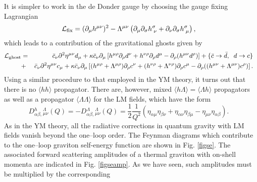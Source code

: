 \documentclass[longbibliography,groupedaddress,showpacs,showkeys,amssymb,eqsecnum,aps,nofootinbib,superscriptaddress]{revtex4}
\newcommand{\be}{\begin{equation}}
\newcommand{\ee}{\end{equation}}
\begin{document}
It is simpler to work in the de Donder gauge by choosing the gauge fixing Lagrangian
\be
{\cal L}_{\rm fix} = (\partial_\mu h^{\mu\nu})^2 - %
\Lambda^{\mu\nu}\left(
\partial_\mu \partial_\sigma h^\sigma_{\;\nu}+
\partial_\nu \partial_\sigma h^\sigma_{\;\mu}
\right),
\ee
which leads to a contribution of the gravitational ghosts given by 
\begin{eqnarray}
{\cal L}_{\rm ghost} &=& 
{\bar c}_\nu\partial^2 \eta^{\mu\nu} d_\mu 
+ \kappa {\bar c}_\nu\partial_\mu\left[
h^{\mu\rho}\partial_\rho d^\nu+h^{\nu\rho}\partial_\rho d^\mu 
-\partial_\rho(h^{\mu\nu} d^\rho) 
\right]+\{\bar c\rightarrow\bar d,\;\; d\rightarrow c \}
\nonumber \\ &+&
{\bar c}_\nu\partial^2 \eta^{\mu\nu} c_\mu 
+ \kappa {\bar c}_\nu\partial_\mu\left[
(h^{\mu\rho}+\Lambda^{\mu\rho})\partial_\rho c^\nu+
(h^{\nu\rho}+\Lambda^{\nu\rho})\partial_\rho c^\mu-
\partial_\rho((h^{\mu\nu} + \Lambda^{\mu\nu}) c^\rho) 
\right].
%
%
\end{eqnarray}
Using a similar procedure to that employed in the YM theory,  it turns out that there is no 
$\langle hh\rangle$ propagator. 
There are, however,  mixed $\langle h\Lambda\rangle=\langle \Lambda h\rangle$ 
propagators as well as a propagator $\langle \Lambda\Lambda\rangle$ 
for the LM fields, which have the form 
\be
D{}^h_{\alpha\beta,}{}^{\Lambda}_{\mu\nu}(Q)
=-D{}^\Lambda_{\alpha\beta,}{}^{\Lambda}_{\mu\nu}(Q)=
\frac 1 2\frac{1}{Q^2} %
\left(
\eta_{\alpha\mu}\eta_{\beta\nu} + \eta_{\alpha\nu}\eta_{\beta\mu}-
\eta_{\mu\nu}\eta_{\alpha\beta}
\right).
\ee
As in the YM theory,  all the radiative corrections in quantum gravity
with LM fields vanish beyond the one--loop order.  
The Feynman diagrams which contribute to the one--loop graviton
self-energy function are shown in Fig. \ref{figse}.
The associated forward scattering amplitudes of a thermal graviton
with on-shell momenta                    are indicated in
Fig. \ref{figseamp}. As we have seen, 
such amplitudes must be multiplied by the corresponding 
\end{document}
